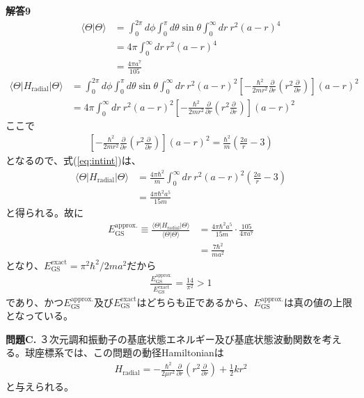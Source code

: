 \documentclass[11pt,pra,aps]{revtex4}
\begin{document}
\noindent
{\bf 解答9}
\begin{align}
  \langle\Theta|\Theta\rangle&=\int^{2\pi}_0d\phi\int^{\pi}_0d\theta\sin\theta\int_0^\infty dr \ r^2 (a-r)^4 \nonumber \\
  &=4\pi \int_0^\infty dr \ r^2 (a-r)^4 \nonumber \\
  &=\frac{4\pi a^7}{105}
\end{align}
\begin{align}
  \langle\Theta|H_\text{radial}|\Theta\rangle&=\int^{2\pi}_0d\phi\int^{\pi}_0d\theta\sin\theta\int_0^\infty dr \ r^2 (a-r)^2 \left[-\frac{\hbar^2}{2mr^2}\frac{\partial}{\partial r}\left(r^2 \frac{\partial}{\partial r}\right) \right] (a-r)^2 \nonumber \\
  &=4\pi\int_0^\infty dr \ r^2 (a-r)^2 \left[-\frac{\hbar^2}{2mr^2}\frac{\partial}{\partial r}\left(r^2 \frac{\partial}{\partial r}\right) \right] (a-r)^2 \label{eq:intint}
\end{align}
ここで
\begin{align}
  \left[-\frac{\hbar^2}{2mr^2}\frac{\partial}{\partial r}\left(r^2 \frac{\partial}{\partial r}\right) \right] (a-r)^2 = \frac{\hbar^2}{m}\left(\frac{2a}{r}-3\right)
\end{align}
となるので、式(\ref{eq:intint})は、
\begin{align}
  \langle\Theta|H_\text{radial}|\Theta\rangle&=\frac{4\pi\hbar^2}{m}\int_0^\infty dr \ r^2 (a-r)^2 \left(\frac{2a}{r}-3\right) \nonumber \\
  &=\frac{4\pi\hbar^2 a^5}{15m}
\end{align}
と得られる。故に
\begin{align}
  E_\text{GS}^\text{approx.}\equiv\frac{\langle\Theta|H_\text{radial}|\Theta\rangle}{\langle\Theta|\Theta\rangle}&=\frac{4\pi\hbar^2 a^5}{15m}\cdot\frac{105}{4\pi a^7} \nonumber \\
  &=\frac{7\hbar^2}{ma^2}
\end{align}
となり、$E_\text{GS}^\text{exact}=\pi^2\hbar^2/2ma^2$だから
\begin{align}
  \frac{E_\text{GS}^\text{approx.}}{E_\text{GS}^\text{exact}}=\frac{14}{\pi^2}>1
\end{align}
であり、かつ$E_\text{GS}^\text{approx.}$及び$E_\text{GS}^\text{exact}$はどちらも正であるから、$E_\text{GS}^\text{approx.}$は真の値の上限となっている。

\noindent
{\bf 問題C.} ３次元調和振動子の基底状態エネルギー及び基底状態波動関数を考える。球座標系では、この問題の動径Hamiltonianは
\begin{align}
  H_\text{radial}=-\frac{\hbar^2}{2\mu r^2}\frac{\partial}{\partial r}\left(r^2 \frac{\partial}{\partial r}\right) + \frac{1}{2}kr^2\label{eq:3dp}
\end{align}    
と与えられる。
\end{document}
